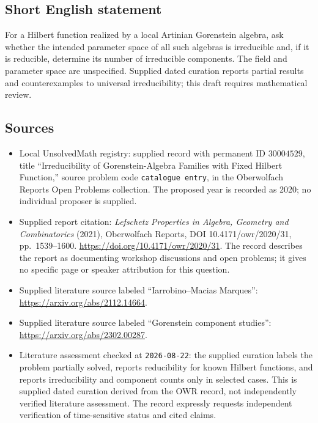 \documentclass[11pt]{article}
\begin{document}
\subsection{Short English statement}
For a Hilbert function realized by a local Artinian Gorenstein algebra, ask whether the intended parameter space of all such algebras is irreducible and, if it is reducible, determine its number of irreducible components. The field and parameter space are unspecified. Supplied dated curation reports partial results and counterexamples to universal irreducibility; this draft requires mathematical review.
\subsection{Sources}
\begin{itemize}
\item Local UnsolvedMath registry: supplied record with permanent ID \(30004529\), title ``Irreducibility of Gorenstein-Algebra Families with Fixed Hilbert Function,'' source problem code \texttt{catalogue entry}, in the Oberwolfach Reports Open Problems collection. The proposed year is recorded as 2020; no individual proposer is supplied.
\item Supplied report citation: \emph{Lefschetz Properties in Algebra, Geometry and Combinatorics} (2021), Oberwolfach Reports, DOI 10.4171/owr/2020/31, pp.\ 1539--1600. \url{https://doi.org/10.4171/owr/2020/31}. The record describes the report as documenting workshop discussions and open problems; it gives no specific page or speaker attribution for this question.
\item Supplied literature source labeled ``Iarrobino--Macias Marques'': \url{https://arxiv.org/abs/2112.14664}.
\item Supplied literature source labeled ``Gorenstein component studies'': \url{https://arxiv.org/abs/2302.00287}.
\item Literature assessment checked at \texttt{2026-08-22}: the supplied curation labels the problem partially solved, reports reducibility for known Hilbert functions, and reports irreducibility and component counts only in selected cases. This is supplied dated curation derived from the OWR record, not independently verified literature assessment. The record expressly requests independent verification of time-sensitive status and cited claims.
\end{itemize}
\end{document}
